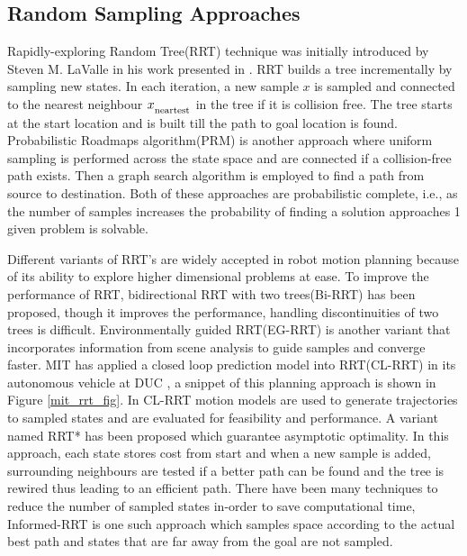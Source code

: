 \subsection{Random Sampling Approaches}
\label{rw_incremental_search}
Rapidly-exploring Random Tree(RRT) technique was initially introduced by Steven M. LaValle in his work presented in \cite{Lavalle_rrt}. RRT builds a tree incrementally by sampling new states. In each iteration, a new sample $x$ is sampled and connected to the nearest neighbour $x_\textsubscript{neartest}$ in the tree if it is collision free. The tree starts at the start location and is built till the path to goal location is found. Probabilistic Roadmaps algorithm\cite{prm}(PRM) is another approach where uniform sampling is performed across the state space and are connected if a collision-free path exists. Then a graph search algorithm is employed to find a path from source to destination. Both of these approaches are probabilistic complete, i.e., as the number of samples increases the probability of finding a solution approaches 1 given problem is solvable.


Different variants of RRT's are widely accepted in robot motion planning because of its ability to explore higher dimensional problems at ease\cite{rrt_higher_dimension}. To improve the performance of RRT, bidirectional RRT with two trees(Bi-RRT) has been proposed, though it improves the performance, handling discontinuities of two trees is difficult\cite{birrt}. Environmentally guided RRT(EG-RRT) is another variant that incorporates information from scene analysis to guide samples and converge faster\cite{egrrt}. MIT has applied a closed loop prediction model into RRT(CL-RRT) in its autonomous vehicle at DUC \cite{mit_rrt}, a snippet of this planning approach is shown in Figure \ref{mit_rrt_fig}. In CL-RRT motion models are used to generate trajectories to sampled states and are evaluated for feasibility and performance. A variant named RRT* \cite{rrt_star} has been proposed which guarantee asymptotic optimality. In this approach, each state stores cost from start and when a new sample is added, surrounding neighbours are tested if a better path can be found and the tree is rewired thus leading to an efficient path. There have been many techniques to reduce the number of sampled states in-order to save computational time, Informed-RRT \cite{informed_rrt} is one such approach which samples space according to the actual best path and states that are far away from the goal are not sampled.

